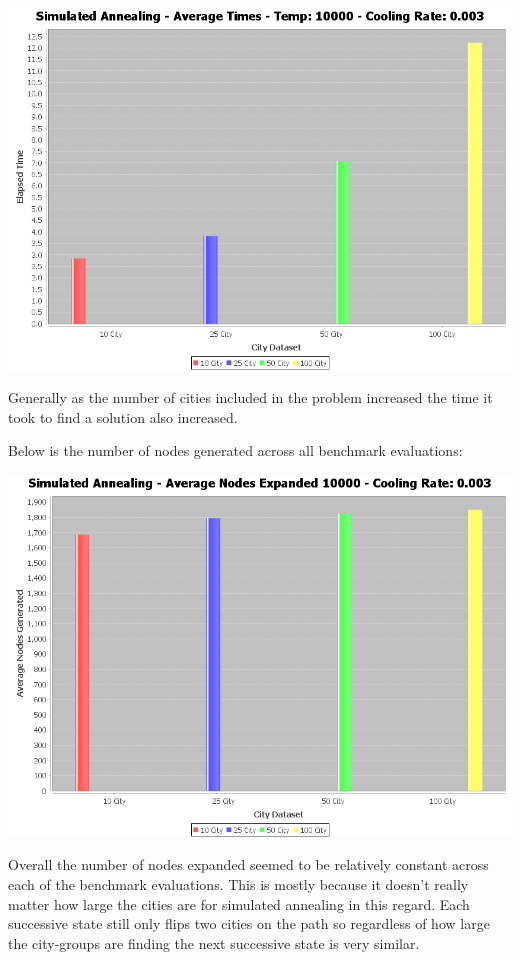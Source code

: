\documentclass[10pt,a4paper]{article}
\begin{document}
\begin{enumerate}[A.]
		\begin{center}
			\includegraphics[scale=0.5]{averagetimes_temp10000_coolingrate003}
		\end{center}
		
		Generally as the number of cities included in the problem increased the time it took to find a solution also increased.
		
		Below is the number of nodes generated across all benchmark evaluations:
		
		\begin{center}
			\includegraphics[scale=0.5]{nodesgen_temp10000_coolingrate003}
		\end{center}
		
		Overall the number of nodes expanded seemed to be relatively constant across each of the benchmark evaluations. This is mostly because it doesn't really matter how large the cities are for simulated annealing in this regard. Each successive state still only flips two cities on the path so regardless of how large the city-groups are finding the next successive state is very similar.
		

\end{enumerate}
\end{document}
